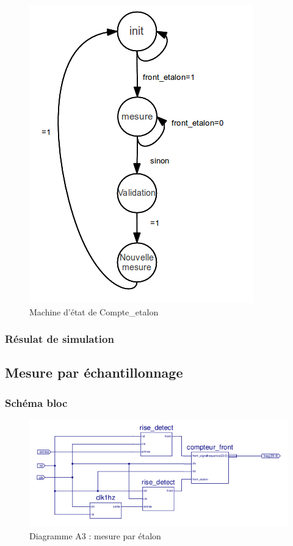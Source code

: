 \documentclass[a4paper,11pt]{article}
\begin{document}
\begin{figure}[H]
\begin{center}
	\includegraphics[scale=.6]{machine_mesureEtalon.png}
	\caption{Machine d'état de Compte\_etalon}
\end{center}
\end{figure}

  
  \subsubsection{Résulat de simulation}

  \subsection{Mesure par échantillonnage}
  \subsubsection{Schéma bloc}
  
  \begin{figure}[H]
\begin{center}
	\includegraphics[scale=1]{sch-etalon.png}
	\caption{Diagramme A3 : mesure par étalon}
\end{center}
\end{figure}
\end{document}
